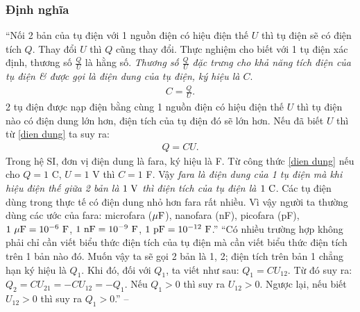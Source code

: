 \documentclass[oneside]{book}
\numberwithin{equation}{section}
\begin{document}
\subsubsection{Định nghĩa}
``Nối 2 bản của tụ điện với 1 nguồn điện có hiệu điện thế $U$ thì tụ điện sẽ có điện tích $Q$. Thay đổi $U$ thì $Q$ cũng thay đổi. Thực nghiệm cho biết với 1 tụ điện xác định, thương số $\frac{Q}{U}$ là hằng số. \textit{Thương số $\frac{Q}{U}$ đặc trưng cho khả năng tích điện của tụ điện \& được gọi là \emph{điện dung} của tụ điện, ký hiệu là $C$}.
\begin{align}
	\label{dien dung}
	C = \frac{Q}{U}.
\end{align}
2 tụ điện được nạp điện bằng cùng 1 nguồn điện có hiệu điện thế $U$ thì tụ điện nào có điện dung lớn hơn, điện tích của tụ điện đó sẽ lớn hơn. Nếu đã biết $U$ thì từ \eqref{dien dung} ta suy ra:
\begin{align}
	\label{dien dung 1}
	Q = CU.
\end{align}
Trong hệ SI, đơn vị điện dung là fara, ký hiệu là F. Từ công thức \eqref{dien dung} nếu cho $Q = 1$ C, $U = 1$ V thì $C = 1$ F. Vậy \textit{fara là điện dung của 1 tụ điện mà khi hiệu điện thế giữa 2 bản là $1\ {\rm V}$ thì điện tích của tụ điện là $1\ {\rm C}$}. Các tụ điện dùng trong thực tế có điện dung nhỏ hơn fara rất nhiều. Vì vậy người ta thường dùng các ước của fara: microfara ($\mu{\rm F}$), nanofara (nF), picofara (pF), $\rm 1\ \mu F = 10^{-6}\ {\rm F}$, $\rm 1\ nF = 10^{-9}\ F$, $\rm 1\ pF = 10^{-12}\ {\rm F}$.'' ``Có nhiều trường hợp không phải chỉ cần viết biểu thức điện tích của tụ điện mà cần viết biểu thức điện tích trên 1 bản nào đó. Muốn vậy ta sẽ gọi 2 bản là 1, 2; điện tích trên bản 1 chẳng hạn ký hiệu là $Q_1$. Khi đó, đối với $Q_1$, ta viết như sau: $Q_1 = CU_{12}$. Từ đó suy ra: $Q_2 = CU_{21} = -CU_{12} = -Q_1$. Nếu $Q_1 > 0$ thì suy ra $U_{12} > 0$. Ngược lại, nếu biết $U_{12} > 0$ thì suy ra $Q_1 > 0$.'' -- \cite[p. 33]{SGK_Vat_Ly_11_nang_cao}
\end{document}
